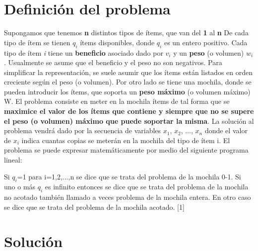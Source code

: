 \documentclass{article}
\begin{document}
\section{Definición del problema}
Supongamos que tenemos \textbf{n} distintos tipos de ítems, que van del \textbf{1} al \textbf{n} De cada tipo de ítem se tienen \(q_{i}\) ítems disponibles, donde \(q_{i}\) es un entero positivo.
Cada tipo de ítem \textit{i} tiene un \textbf{beneficio} asociado dado por \(v_{i}\) y un \textbf{peso} (o volumen) \(w_{i}\). Usualmente se asume que el beneficio y el peso no son negativos. Para simplificar la representación, se suele asumir que los ítems están listados en orden creciente según el peso (o volumen).
Por otro lado se tiene una mochila, donde se pueden introducir los ítems, que soporta un \textbf{peso máximo} (o volumen máximo) W.
El problema consiste en meter en la mochila ítems de tal forma que se \textbf{maximice el valor de los ítems que contiene y siempre que no se supere el peso (o volumen) máximo que puede soportar la misma}. La solución al problema vendrá dado por la secuencia de variables \(x_{1}\), \(x_{2}\), ..., \(x_{n}\) donde el valor de \(x_{i}\) indica cuantas copias se meterán en la mochila del tipo de ítem i.
\newline
El problema se puede expresar matemáticamente por medio del siguiente programa lineal:
\newline

{}

\vspace{5mm}
Si \(q_{i}\)=1 para i=1,2,...,n se dice que se trata del problema de la mochila 0-1. Si uno o más \(q_{i}\) es infinito entonces se dice que se trata del problema de la mochila no acotado también llamado a veces problema de la mochila entera. En otro caso se dice que se trata del problema de la mochila acotado. [1]


\section{Solución}

\begin{framed}

\end{framed}
\end{document}
